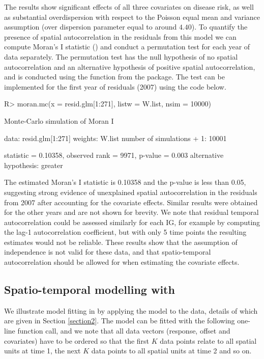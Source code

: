 \documentclass[article, nojss]{jss}
\begin{document}
The results show significant effects of all three covariates on disease risk, as well as substantial overdispersion with respect to the Poisson equal mean and variance assumption (over dispersion parameter equal to around $4.40$). To quantify the presence of spatial autocorrelation in the residuals from this model we can compute Moran's I statistic (\citealp{moran1950}) and conduct a permutation test for each year of data separately. The permutation test has the null hypothesis of no spatial autocorrelation and an alternative hypothesis of positive spatial autocorrelation, and is conducted using the  function from the  package. The test can be implemented for the first year of residuals (2007) using the code below.

\begin{Schunk}
\begin{Sinput}
R>  moran.mc(x = resid.glm[1:271], listw = W.list, nsim = 10000)
\end{Sinput}
\begin{Soutput}
	Monte-Carlo simulation of Moran I

data:  resid.glm[1:271] 
weights: W.list  
number of simulations + 1: 10001 

statistic = 0.10358, observed rank = 9971, p-value = 0.003
alternative hypothesis: greater
\end{Soutput}
\end{Schunk}

The estimated Moran's I statistic is 0.10358 and the p-value is less than 0.05, suggesting strong evidence of unexplained spatial autocorrelation in the residuals from 2007 after accounting for the covariate effects. Similar results were obtained for the other years and are not shown for brevity. We note that residual temporal autocorrelation could be assessed similarly for each IG, for example by computing the lag-1 autocorrelation coefficient, but with only 5 time points the resulting estimates would not be reliable. These results show that the assumption of independence is not valid for these data, and that spatio-temporal autocorrelation should be allowed for when estimating the covariate effects. 


\subsection[Spatio-temporal modelling with CARBayesST]{Spatio-temporal modelling with }
We illustrate model fitting in  by applying the  model to the data, details of which are given in Section \ref{section2}. The model can be fitted with the following one-line function call, and we note that all data vectors (response, offset and covariates) have to be ordered so that the first $K$ data points relate to all spatial units at time 1, the next $K$ data points to all spatial units at time 2 and so on.
\end{document}
